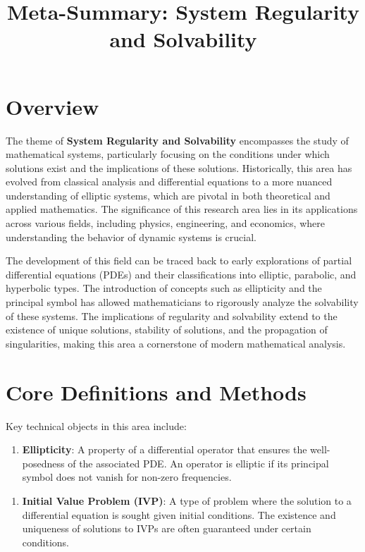\documentclass[11pt,a4paper]{article}
\title{Meta-Summary: System Regularity and Solvability}
\date{}
\begin{document}
\maketitle

\section{Overview}
The theme of \textbf{System Regularity and Solvability} encompasses the study of mathematical systems, particularly focusing on the conditions under which solutions exist and the implications of these solutions. Historically, this area has evolved from classical analysis and differential equations to a more nuanced understanding of elliptic systems, which are pivotal in both theoretical and applied mathematics. The significance of this research area lies in its applications across various fields, including physics, engineering, and economics, where understanding the behavior of dynamic systems is crucial.

The development of this field can be traced back to early explorations of partial differential equations (PDEs) and their classifications into elliptic, parabolic, and hyperbolic types. The introduction of concepts such as ellipticity and the principal symbol has allowed mathematicians to rigorously analyze the solvability of these systems. The implications of regularity and solvability extend to the existence of unique solutions, stability of solutions, and the propagation of singularities, making this area a cornerstone of modern mathematical analysis.

\section{Core Definitions and Methods}
Key technical objects in this area include:

\begin{enumerate}
\item \textbf{Ellipticity}: A property of a differential operator that ensures the well-posedness of the associated PDE. An operator is elliptic if its principal symbol does not vanish for non-zero frequencies.
\end{enumerate}

\begin{enumerate}
\item \textbf{Initial Value Problem (IVP)}: A type of problem where the solution to a differential equation is sought given initial conditions. The existence and uniqueness of solutions to IVPs are often guaranteed under certain conditions.
\end{enumerate}
\end{document}
